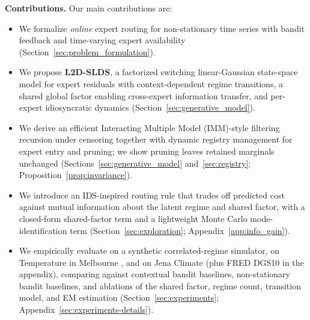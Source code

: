 \textbf{Contributions.}
Our main contributions are:
\begin{itemize}[topsep=2pt,itemsep=1pt,parsep=0pt,leftmargin=1.2em]
    \item We formalize \emph{online} expert routing for non-stationary time series with bandit feedback and time-varying expert availability (Section~\ref{sec:problem_formulation}).
    \item We propose \textbf{L2D-SLDS}, a factorized switching linear-Gaussian state-space model for expert residuals with context-dependent regime transitions, a shared global factor enabling cross-expert information transfer, and per-expert idiosyncratic dynamics (Section~\ref{sec:generative_model}).
    \item We derive an efficient Interacting Multiple Model (IMM)-style \citep{johnston2002improvement} filtering recursion under censoring together with dynamic registry management for expert entry and pruning; we show pruning leaves retained marginals unchanged (Sections~\ref{sec:generative_model} and~\ref{sec:registry}; Proposition~\ref{prop:invariance}).
    \item We introduce an IDS-inspired routing rule \citep{russo2014learning} that trades off predicted cost against mutual information about the latent regime and shared factor, with a closed-form shared-factor term and a lightweight Monte Carlo mode-identification term (Section~\ref{sec:exploration}; Appendix~\ref{app:info_gain}).
    \item We empirically evaluate on a synthetic correlated-regime simulator, on Temperature in Melbourne \citep{daily_min_temp_melbourne_kaggle}, and on Jena Climate (plus FRED DGS10 in the appendix), comparing against contextual bandit baselines, non-stationary bandit baselines, and ablations of the shared factor, regime count, transition model, and EM estimation (Section~\ref{sec:experiments}; Appendix~\ref{sec:experiments-details}).
\end{itemize}



